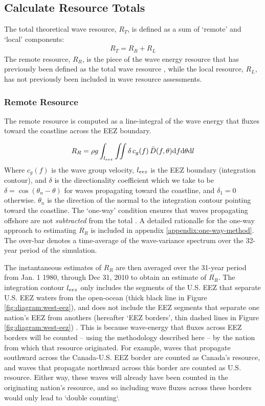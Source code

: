 \subsection{Calculate Resource Totals} \label{sec:method:calc}

The total theoretical wave resource, $R_T$, is defined as a sum of `remote' and `local' components:
\begin{align}
  R_T = R_R + R_L
\end{align}
The remote resource, $R_R$, is the piece of the wave energy resource that has previously been defined as the total wave resource \citep{gunnQuantifyingGlobalWave2012,EPRIwaveresource2011}, while the local resource, $R_L$, has not previously been included in wave resource assessments.

\subsubsection{Remote Resource} \label{sec:method:calc:remote}

The remote resource is computed as a line-integral of the wave energy that fluxes toward the coastline across the EEZ boundary. 

\begin{align}
  R_R = \rho g \int_{l_{eez}}\iint \delta \, c_g(f) \, \bar{D}(f,\theta) \mathrm{d} f \mathrm{d} \theta \mathrm{d} l
\end{align}
Where $c_g(f)$ is the wave group velocity, $l_{eez}$ is the EEZ boundary (integration contour), and $\delta$ is the directionality coefficient which we take to be $\delta = \cos(\theta_n - \theta)$ for waves propagating toward the coastline, and $\delta_1 = 0$ otherwise. $\theta_n$ is the direction of the normal to the integration contour pointing toward the coastline. The `one-way' condition ensures that waves propagating offshore are not {\em subtracted} from the total \citep[]{gunnQuantifyingGlobalWave2012}. A detailed rationalle for the one-way approach to estimating $R_R$ is included in appendix \ref{appendix:one-way-method}. The over-bar denotes a time-average of the wave-variance spectrum over the 32-year period of the simulation. 

The instantaneous estimates of $R_R$ are then averaged over the 31-year period from Jan. 1 1980, through Dec 31, 2010 to obtain an estimate of $\overline{R_R}$.
The integration contour $l_{eez}$ only includes the segments of the U.S. EEZ that separate U.S. EEZ waters from the open-ocean (thick black line in Figure \ref{fig:diagram:west-eez}), and does not include the EEZ segments that separate one nation's EEZ from anothers (hereafter `EEZ borders', thin dashed lines in Figure \ref{fig:diagram:west-eez}) \citep[]{flandersmarineinstituteMaritimeBoundariesGeodatabase2018}. This is because wave-energy that fluxes across EEZ borders will be counted -- using the methodology described here -- by the nation from which that resource originated. For example, waves that propagate southward across the Canada-U.S. EEZ border are counted as Canada's resource, and waves that propagate northward across this border are counted as U.S. resource. Either way, these waves will already have been counted in the originating nation's resource, and so including wave fluxes across these borders would only lead to `double counting`.


